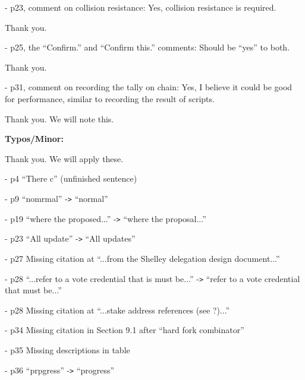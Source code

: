 \vspace{12pt}
- p23, comment on collision resistance: Yes, collision resistance is required.

\vspace{12pt}
{\color{color02} Thank you.}

\vspace{12pt}
- p25, the ``Confirm.'' and ``Confirm this.'' comments: Should be ``yes'' to both.

\vspace{12pt}
{\color{color02} Thank you.}

\vspace{12pt}
- p31, comment on recording the tally on chain: Yes, I believe it could be good 
for performance, similar to recording the result of scripts.

\vspace{12pt}
{\color{color02} Thank you.  We will note this.}

\vspace{12pt}
\begin{center}
\textbf{Typos/Minor:}
\end{center}

\baselineskip=12pt
\leftskip=0pt
{\color{color02} Thank you. We will apply these.}

\vspace{12pt}
- p4 ``There c'' (unfinished sentence)

\vspace{12pt}
- p9 ``nomrmal'' -\texttt{>} ``normal''

\vspace{12pt}
- p19 ``where the proposed...'' -\texttt{>} ``where the proposal...''

\vspace{12pt}
- p23 ``All update'' -\texttt{>} ``All updates''

\vspace{12pt}
- p27 Missing citation at ``...from the Shelley delegation design document...''

\vspace{12pt}
- p28 ``...refer to a vote credential that is must be...'' -\texttt{>} ``refer 
to a vote credential that must be...''

\vspace{12pt}
- p28 Missing citation at ``...stake address references (see ?)...''

\vspace{12pt}
- p34 Missing citation in Section 9.1 after ``hard fork combinator''

\vspace{12pt}
- p35 Missing descriptions in table

\vspace{12pt}
- p36 ``prpgress'' -\texttt{>} ``progress''

\newpage

